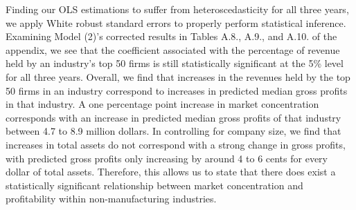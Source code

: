 Finding our OLS estimations to suffer from heteroscedasticity for all three years, we apply White robust standard errors to properly perform statistical inference. Examining Model (2)'s corrected results in Tables A.8., A.9., and A.10. of the appendix, we see that the coefficient associated with the percentage of revenue held by an industry's top 50 firms is still statistically significant at the 5\% level for all three years. Overall, we find that increases in the revenues held by the top 50 firms in an industry correspond to increases in predicted median gross profits in that industry. A one percentage point increase in market concentration corresponds with an increase in predicted median gross profits of that industry between 4.7 to 8.9 million dollars. In controlling for company size, we find that increases in total assets do not correspond with a strong change in gross profits, with predicted gross profits only increasing by around 4 to 6 cents for every dollar of total assets. Therefore, this allows us to state that there does exist a statistically significant relationship between market concentration and profitability within non-manufacturing industries.

\iffalse
Finding our OLS estimation to have an interpretation of long-run equilibrium because of cointegration, we disregard heteroscedasticity as a problem for said interpretation. Re-examining Model (2)'s results in Table A.4. of the appendix, we find, in the long run, that increases in the revenues held by the top 50 firms in an industry correspond to increases predicted gross profit levels. A one percentage point increase in industry concentration corresponds with a 8.327 million dollar increase in predicted median gross profits in that industry. In the long run and controlling for company size, we find that increases in total assets do not correspond with a strong change in gross profits, with predicted gross profits only increasing by around 4 cents for every dollar of total assets. Because these non-zero values represent the true values of Model (2)'s super-consistent estimators, we are able to state that there does exists strong relationship between market concentration and profitability amongst non-manufacturing industries.
\fi

